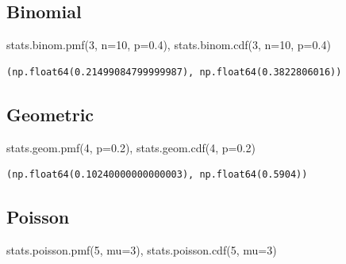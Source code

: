 \documentclass[
  letterpaper,
  DIV=11,
  numbers=noendperiod]{scrreprt}
\newenvironment{Shaded}{\begin{snugshade}}{\end{snugshade}}
\newcommand{\DecValTok}[1]{\textcolor[rgb]{0.68,0.00,0.00}{#1}}
\newcommand{\FloatTok}[1]{\textcolor[rgb]{0.68,0.00,0.00}{#1}}
\newcommand{\NormalTok}[1]{\textcolor[rgb]{0.00,0.23,0.31}{#1}}
\newcommand{\OperatorTok}[1]{\textcolor[rgb]{0.37,0.37,0.37}{#1}}
\begin{document}
\subsection{Binomial}\label{binomial-1}

\begin{Shaded}
\begin{Highlighting}[]
\NormalTok{stats.binom.pmf(}\DecValTok{3}\NormalTok{, n}\OperatorTok{=}\DecValTok{10}\NormalTok{, p}\OperatorTok{=}\FloatTok{0.4}\NormalTok{), stats.binom.cdf(}\DecValTok{3}\NormalTok{, n}\OperatorTok{=}\DecValTok{10}\NormalTok{, p}\OperatorTok{=}\FloatTok{0.4}\NormalTok{)}
\end{Highlighting}
\end{Shaded}

\begin{verbatim}
(np.float64(0.21499084799999987), np.float64(0.3822806016))
\end{verbatim}

\subsection{Geometric}\label{geometric-1}

\begin{Shaded}
\begin{Highlighting}[]
\NormalTok{stats.geom.pmf(}\DecValTok{4}\NormalTok{, p}\OperatorTok{=}\FloatTok{0.2}\NormalTok{), stats.geom.cdf(}\DecValTok{4}\NormalTok{, p}\OperatorTok{=}\FloatTok{0.2}\NormalTok{)}
\end{Highlighting}
\end{Shaded}

\begin{verbatim}
(np.float64(0.10240000000000003), np.float64(0.5904))
\end{verbatim}

\subsection{Poisson}\label{poisson-1}

\begin{Shaded}
\begin{Highlighting}[]
\NormalTok{stats.poisson.pmf(}\DecValTok{5}\NormalTok{, mu}\OperatorTok{=}\DecValTok{3}\NormalTok{), stats.poisson.cdf(}\DecValTok{5}\NormalTok{, mu}\OperatorTok{=}\DecValTok{3}\NormalTok{)}
\end{Highlighting}
\end{Shaded}
\end{document}
